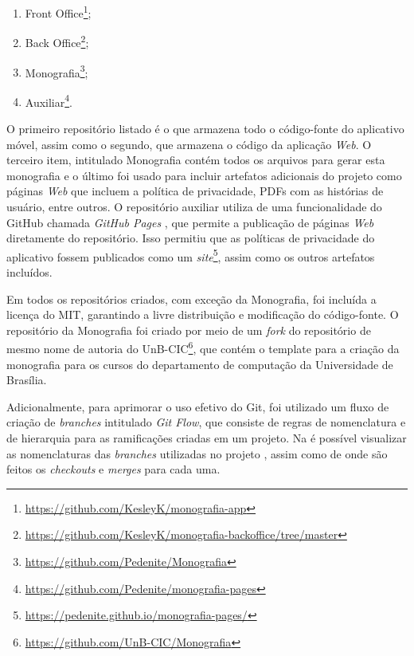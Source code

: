 \begin{enumerate}
    \item Front Office\footnote{\url{https://github.com/KesleyK/monografia-app}};
    \item Back Office\footnote{\url{https://github.com/KesleyK/monografia-backoffice/tree/master}};
    \item Monografia\footnote{\url{https://github.com/Pedenite/Monografia}};
    \item Auxiliar\footnote{\url{https://github.com/Pedenite/monografia-pages}}.
\end{enumerate}

O primeiro repositório listado é o que armazena todo o código-fonte do aplicativo móvel, assim como o segundo, que armazena o código da aplicação \textit{Web}. O terceiro item, intitulado Monografia contém todos os arquivos para gerar esta monografia e o último foi usado para incluir artefatos adicionais do projeto como páginas \textit{Web} que incluem a política de privacidade, PDFs com as histórias de usuário, entre outros. O repositório auxiliar utiliza de uma funcionalidade do GitHub chamada \textit{GitHub Pages} \cite{github-pages}, que permite a publicação de páginas \textit{Web} diretamente do repositório. Isso permitiu que as políticas de privacidade do aplicativo fossem publicados como um \textit{site}\footnote{\url{https://pedenite.github.io/monografia-pages/}}, assim como os outros artefatos incluídos.

Em todos os repositórios criados, com exceção da Monografia, foi incluída a licença do MIT, garantindo a livre distribuição e modificação do código-fonte. O repositório da Monografia foi criado por meio de um \textit{fork} do repositório de mesmo nome de autoria do UnB-CIC\footnote{\url{https://github.com/UnB-CIC/Monografia}}, que contém o template para a criação da monografia para os cursos do departamento de computação da Universidade de Brasília. 

Adicionalmente, para aprimorar o uso efetivo do Git, foi utilizado um fluxo de criação de \textit{branches} intitulado \textit{Git Flow}, que consiste de regras de nomenclatura e de hierarquia para as ramificações criadas em um projeto. Na  é possível visualizar as nomenclaturas das \textit{branches} utilizadas no projeto \appName, assim como de onde são feitos os \textit{checkouts} e \textit{merges} para cada uma.


